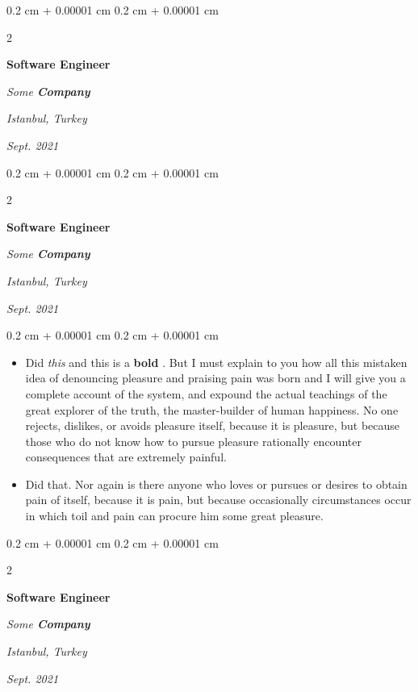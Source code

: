 \documentclass[10pt, letterpaper]{article}
\newenvironment{highlights}{
    \begin{itemize}[
        topsep=0.10 cm,
        parsep=0.10 cm,
        partopsep=0pt,
        itemsep=0pt,
        leftmargin=0.4 cm + 10pt
    ]
}{
    \end{itemize}
} %
\newenvironment{onecolentry}{
    \begin{adjustwidth}{
        0.2 cm + 0.00001 cm
    }{
        0.2 cm + 0.00001 cm
    }
}{
    \end{adjustwidth}
} %
\newenvironment{twocolentry}[2][]{
    \onecolentry
    \def\secondColumn{#2}
    \setcolumnwidth{\fill, 4.5 cm}
    \begin{paracol}{2}
}{
    \switchcolumn \raggedleft \secondColumn
    \end{paracol}
    \endonecolentry
} %
\let\hrefWithoutArrow\href
\renewcommand{\href}[2]{\hrefWithoutArrow{#1}{\mbox{\ifthenelse{\equal{#2}{}}{ }{#2 }\raisebox{.15ex}{\footnotesize \faExternalLink*}}}}
\begin{document}
        \vspace{0.2 cm-3px}

        \begin{twocolentry}{
        \textit{Istanbul, Turkey}    
            
        \textit{Sept. 2021}}
            \textbf{Software Engineer}
            
            \textit{Some \textbf{Company}}
        \end{twocolentry}



        \vspace{0.2 cm-3px}

        \begin{twocolentry}{
        \textit{Istanbul, Turkey}    
            
        \textit{Sept. 2021}}
            \textbf{Software Engineer}
            
            \textit{Some \textbf{Company}}
        \end{twocolentry}

        \vspace{0.10 cm-3px}
        \begin{onecolentry}
            \begin{highlights}
                \item Did \textit{this} and this is a \textbf{bold} \href{https://example.com}{link}. But I must explain to you how all this mistaken idea of denouncing pleasure and praising pain was born and I will give you a complete account of the system, and expound the actual teachings of the great explorer of the truth, the master-builder of human happiness. No one rejects, dislikes, or avoids pleasure itself, because it is pleasure, but because those who do not know how to pursue pleasure rationally encounter consequences that are extremely painful.
                \item Did that. Nor again is there anyone who loves or pursues or desires to obtain pain of itself, because it is pain, but because occasionally circumstances occur in which toil and pain can procure him some great pleasure.
            \end{highlights}
        \end{onecolentry}


        \vspace{0.2 cm-3px}

        \begin{twocolentry}{
        \textit{Istanbul, Turkey}    
            
        \textit{Sept. 2021}}
            \textbf{Software Engineer}
            
            \textit{Some \textbf{Company}}
        \end{twocolentry}
\end{document}
